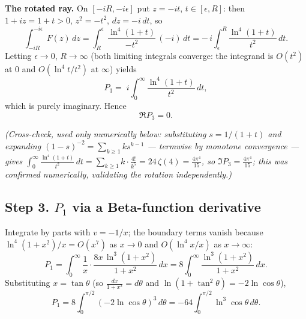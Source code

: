 \documentclass[11pt]{article}
\theoremstyle{remark}
\begin{document}
\textbf{The rotated ray.} On $[-iR,-i\epsilon]$ put $z=-it$, $t\in[\epsilon,R]$: then $1+iz=1+t>0$, $z^2=-t^2$, $dz=-i\,dt$, so
\[
\int_{-iR}^{-i\epsilon}F(z)\,dz=\int_R^\epsilon\frac{\ln^4(1+t)}{-t^2}\,(-i)\,dt
=-\,i\int_\epsilon^R\frac{\ln^4(1+t)}{t^2}\,dt .
\]
Letting $\epsilon\to0$, $R\to\infty$ (both limiting integrals converge: the integrand is $O(t^2)$ at $0$ and $O(\ln^4t/t^2)$ at $\infty$) yields
\[
P_3=\;i\int_0^\infty\frac{\ln^4(1+t)}{t^2}\,dt ,
\]
which is purely imaginary. Hence
\[
\Re P_3=0 .
\]

\textit{(Cross-check, used only numerically below: substituting $s=1/(1+t)$ and expanding $(1-s)^{-2}=\sum_{k\ge1}ks^{k-1}$ --- termwise by monotone convergence --- gives $\int_0^\infty\frac{\ln^4(1+t)}{t^2}\,dt=\sum_{k\ge1}k\cdot\frac{4!}{k^5}=24\,\zeta(4)=\frac{4\pi^4}{15}$, so $\Im P_3=\frac{4\pi^4}{15}$; this was confirmed numerically, validating the rotation independently.)}

\subsection*{Step 3. $P_1$ via a Beta-function derivative}

Integrate by parts with $v=-1/x$; the boundary terms vanish because $\ln^4(1+x^2)/x=O(x^7)$ as $x\to0$ and $O(\ln^4x/x)$ as $x\to\infty$:
\[
P_1=\int_0^\infty\frac{1}{x}\cdot\frac{8x\,\ln^3(1+x^2)}{1+x^2}\,dx
=8\int_0^\infty\frac{\ln^3(1+x^2)}{1+x^2}\,dx .
\]
Substituting $x=\tan\theta$ (so $\frac{dx}{1+x^2}=d\theta$ and $\ln(1+\tan^2\theta)=-2\ln\cos\theta$),
\[
P_1=8\int_0^{\pi/2}(-2\ln\cos\theta)^3\,d\theta=-64\int_0^{\pi/2}\ln^3\cos\theta\,d\theta .
\]
\end{document}
